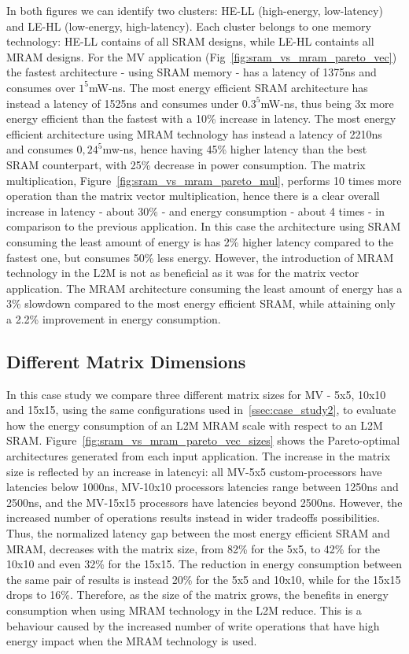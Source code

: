 In both figures we can identify two clusters: HE-LL (high-energy, low-latency) and LE-HL (low-energy, high-latency). Each cluster belongs to one memory technology: HE-LL contains of all SRAM designs, while LE-HL containts all MRAM designs. 
For the MV application (Fig~\ref{fig:sram_vs_mram_pareto_vec}) the fastest architecture - using SRAM memory - has a latency of 1375ns and consumes over $1^5$mW-ns. The most energy efficient SRAM architecture has instead a latency of 1525ns and consumes under $0.3^5$mW-ns, thus being 3x more energy efficient than the fastest with a 10\% increase in latency. The most energy efficient architecture using MRAM technology has instead a latency of 2210ns and consumes $0,24^5$mw-ns, hence having 45\% higher latency than the best SRAM counterpart, with 25\% decrease in power consumption. The matrix multiplication, Figure~\ref{fig:sram_vs_mram_pareto_mul}, performs 10 times more operation than the matrix vector multiplication, hence there is a clear overall increase in latency - about 30\% - and energy consumption - about 4 times -  in comparison to the previous application. In this case the architecture using SRAM consuming the least amount of energy is has 2\% higher latency compared to the fastest one, but consumes 50\% less energy. However, the introduction of MRAM technology in the L2M is not as beneficial as it was for the matrix vector application. The MRAM architecture consuming the least amount of energy has a 3\% slowdown compared to the most energy efficient SRAM, while attaining only a 2.2\% improvement in energy consumption. 

\subsection{Different Matrix Dimensions}
In this case study we compare three different matrix sizes for MV - 5x5, 10x10 and 15x15, using the same configurations used in~\ref{ssec:case_study2}, to evaluate how the energy consumption of an L2M MRAM scale with respect to an L2M SRAM. Figure~\ref{fig:sram_vs_mram_pareto_vec_sizes} shows the Pareto-optimal architectures generated from each input application. The increase in the matrix size is reflected by an increase in latencyi: all MV-5x5 custom-processors have latencies below 1000ns, MV-10x10 processors latencies range between 1250ns and 2500ns, and the MV-15x15 processors have latencies beyond 2500ns. 
However, the increased number of operations results instead in wider tradeoffs possibilities. Thus, the normalized latency gap between the most energy efficient SRAM and MRAM, decreases with the matrix size, from 82\% for the 5x5, to 42\% for the 10x10 and even 32\% for the 15x15. The reduction in energy consumption between the same pair of results is instead 20\% for the 5x5 and 10x10, while for the 15x15 drops to 16\%. Therefore, as the size of the matrix grows, the benefits in energy consumption when using MRAM technology in the L2M reduce. This is a behaviour caused by the increased number of write operations that have high energy impact when the MRAM technology is used. 

